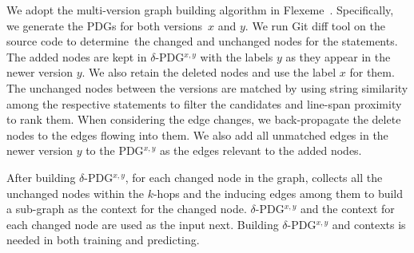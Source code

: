 
We adopt the multi-version graph building algorithm in
Flexeme~\cite{flexeme-fse20}. Specifically, we generate the PDGs
for both versions~$x$ and $y$. We run Git diff tool on the source
code to determine~the changed and unchanged nodes for the
statements. The added nodes are kept in $\delta$-PDG$^{x,y}$ with the
labels $y$ as they appear in the newer version $y$. We also retain the
deleted nodes and use the label $x$ for them. The unchanged nodes
between the versions are matched by using string similarity among the
respective statements to filter the candidates and line-span proximity
to rank them. When considering the edge changes, we back-propagate the
delete nodes to the edges flowing into them. We also add all unmatched
edges in the newer version $y$ to the PDG$^{x,y}$ as the edges
relevant to the added nodes.




After building $\delta$-PDG$^{x,y}$, for each changed node in the
graph, \tool collects all the unchanged nodes within the $k$-hops and
the inducing edges among them to build a sub-graph as the context for
the changed node. $\delta$-PDG$^{x,y}$ and the context for each
changed node are used as the input next. Building
$\delta$-PDG$^{x,y}$ and contexts is needed in both training and
predicting.

